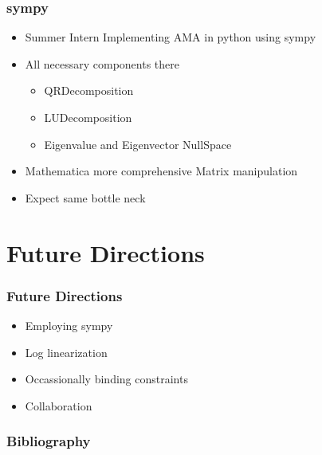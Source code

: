\documentclass[handout]{beamer}
\begin{document}
\begin{frame}
  \frametitle{sympy}
  
  \begin{itemize}
  \item Summer Intern Implementing AMA in python using sympy
  \item All necessary components there
    \begin{itemize}
    \item QRDecomposition
    \item LUDecomposition
    \item Eigenvalue and Eigenvector  NullSpace
    \end{itemize}
  \item Mathematica more comprehensive Matrix manipulation
  \item Expect same bottle neck
  \end{itemize}
\end{frame}



\section{Future Directions}

\begin{frame}
  \frametitle{Future Directions}
  \begin{itemize}
  \item Employing sympy
 \item Log linearization 
\item Occassionally binding constraints
\item Collaboration %
  \end{itemize}
\end{frame}

\begin{frame}
  \frametitle{Bibliography}
  


\end{frame}


\end{document}
